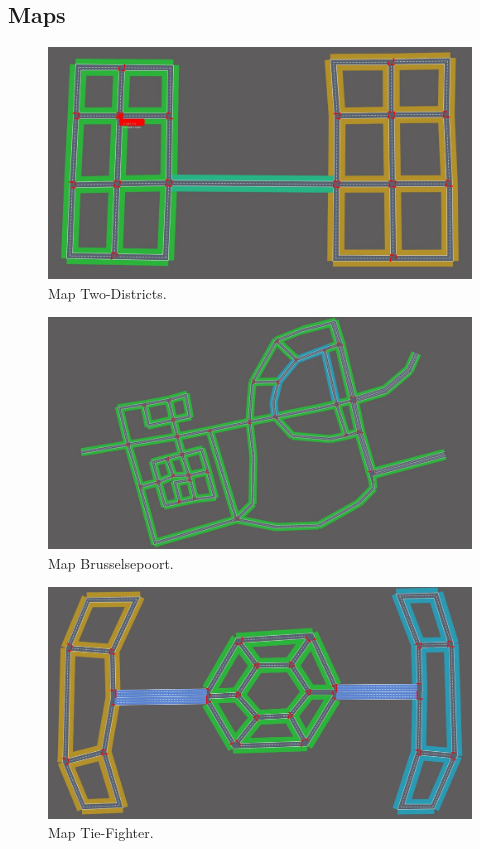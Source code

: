 \documentclass[11pt]{article}
\begin{document}
\clearpage
\raggedbottom
\appendix
\begin{appendix}
\section{Maps}
\begin{figure}[h]
	\includegraphics[width=\linewidth]{img/twodistr.jpeg}
	\caption{Map Two-Districts.}
\end{figure}

\begin{figure}[h]
	\includegraphics[width=\linewidth]{img/maas.jpeg}
	\caption{Map Brusselsepoort.}
\end{figure}

\begin{figure}[h]
	\includegraphics[width=\linewidth]{img/tie.jpeg}
	\caption{Map Tie-Fighter.}
\end{figure}


\end{appendix}
\end{document}
